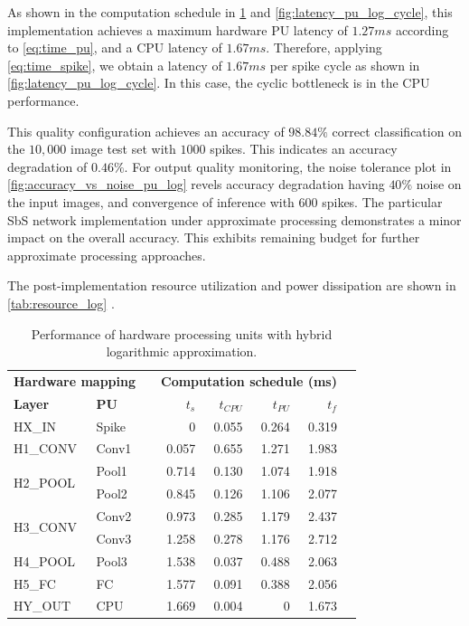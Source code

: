 As shown in the computation schedule in \ref{tab:latency_log} and \ref{fig:latency_pu_log_cycle}, this implementation achieves a maximum hardware PU latency of $1.27 ms$ according to \ref{eq:time_pu}, and a CPU latency of $1.67 ms$. Therefore, applying \ref{eq:time_spike}, we obtain a latency of $1.67 ms$ per spike cycle as shown in \ref{fig:latency_pu_log_cycle}. In this case, the cyclic bottleneck is in the CPU performance.

This quality configuration achieves an accuracy of $98.84\%$ correct classification on the $10,000$ image test set with $1000$ spikes. This indicates an accuracy degradation of $0.46\%$. For output quality monitoring, the noise tolerance plot in \ref{fig:accuracy_vs_noise_pu_log} revels accuracy degradation having $40\%$ noise on the input images, and convergence of inference with $600$ spikes. The particular SbS network implementation under approximate processing demonstrates a minor impact on the overall accuracy. This exhibits remaining budget for further approximate processing approaches.

The post-implementation resource utilization and power dissipation
are shown in \ref{tab:resource_log}
.

\begin{table}[t!]\centering
	\caption{Performance of hardware processing units with hybrid logarithmic approximation.}\label{tab:latency_log}
	\scriptsize
	\begin{tabular}{llrrrrrr}\toprule
		\multicolumn{2}{c}{\textbf{Hardware mapping}} & &\multicolumn{4}{c}{\textbf{Computation schedule (ms)}} \\\cmidrule{1-2}\cmidrule{4-7}
		\textbf{Layer} &\textbf{PU} & &$t_s$ &$t_{CPU}$ &$t_{PU}$ &$t_f$ \\\midrule
		HX\_IN &Spike & &0 &0.055 &0.264 &0.319 \\
		H1\_CONV &Conv1 & &0.057 &0.655 &1.271 &1.983 \\
		\multirow{2}{*}{H2\_POOL} &Pool1 & &0.714 &0.130 &1.074 &1.918 \\
		&Pool2 & &0.845 &0.126 &1.106 &2.077 \\
		\multirow{2}{*}{H3\_CONV} &Conv2 & &0.973 &0.285 &1.179 &2.437 \\
		&Conv3 & &1.258 &0.278 &1.176 &2.712 \\
		H4\_POOL &Pool3 & &1.538 &0.037 &0.488 &2.063 \\
		H5\_FC &FC & &1.577 &0.091 &0.388 &2.056 \\
		HY\_OUT &CPU & &1.669 &0.004 &0 &1.673 \\
		\bottomrule
	\end{tabular}
\end{table}


